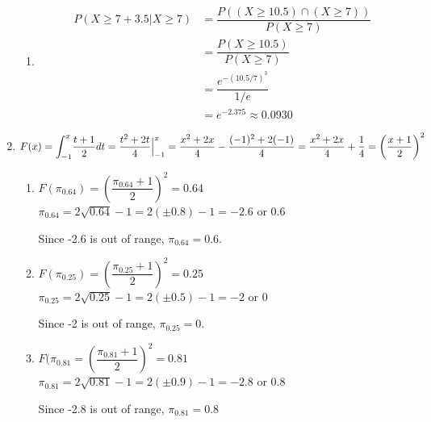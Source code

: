\documentclass{article}
\begin{document}
\begin{enumerate}
\begin{enumerate}
	 \item
	  \begin{align*}
	   P(X \ge 7 + 3.5 | X \ge 7) &= \dfrac{P((X \ge 10.5) \cap (X \ge 7))}{P(X \ge 7)} \\
		&= \dfrac{P(X \ge 10.5)}{P(X \ge 7)} \\
		&= \dfrac{e^{-(10.5/7)^3}}{1/e} \\
		&= e^{-2.375} \approx 0.0930
	  \end{align*}
	\end{enumerate}
      
      \item
	$F(x) = \mathlarger{\int}_{-1}^x {\dfrac{t+1}{2} dt} = \dfrac{t^2 + 2t}{4} \Big|_{-1}^x
	  = \dfrac{x^2 + 2x}{4} - \dfrac{(-1)^2 + 2(-1)}{4} = \dfrac{x^2 + 2x}{4} + \dfrac{1}{4}
	  = \left(\dfrac{x+1}{2}\right)^2$
	  
	\begin{enumerate}
	 \item 
	  $F(\pi_{0.64}) = \left(\dfrac{\pi_{0.64} + 1}{2}\right)^2 = 0.64$ \\
	  $\pi_{0.64} = 2\sqrt{0.64} - 1 = 2 (\pm0.8) - 1 = -2.6$ or $0.6$
	  
	  Since -2.6 is out of range, $\pi_{0.64} = 0.6$.
	 
	 \item
	  $F(\pi_{0.25}) = \left(\dfrac{\pi_{0.25} + 1}{2}\right)^2 = 0.25$ \\
	  $\pi_{0.25} = 2\sqrt{0.25} - 1 = 2 (\pm0.5) - 1 = -2$ or $0$
	  
	  Since -2 is out of range, $\pi_{0.25} = 0$.
	 
	 \item
	  $F(\pi_{0.81} = \left(\dfrac{\pi_{0.81} + 1}{2}\right)^2 = 0.81$ \\
	  $\pi_{0.81} = 2\sqrt{0.81} - 1 = 2 (\pm0.9) - 1 = -2.8$ or $0.8$
	  
	  Since -2.8 is out of range, $\pi_{0.81} = 0.8$
	 
	\end{enumerate}

	
    \end{enumerate}
\end{document}
